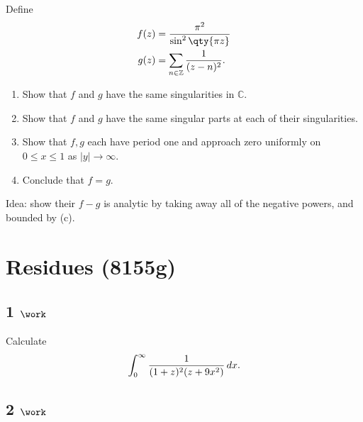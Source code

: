Define
\begin{align*}
f(z) &= {\pi^2 \over \sin^2 \qty{\pi z} } \\
g(z) &= \sum_{n\in {\mathbb{Z}}} {1\over (z-n)^2}
.\end{align*}

\begin{enumerate}
\def\labelenumi{\alph{enumi}.}
\tightlist
\item
  Show that \(f\) and \(g\) have the same singularities in
  \({\mathbb{C}}\).
\item
  Show that \(f\) and \(g\) have the same singular parts at each of
  their singularities.
\item
  Show that \(f, g\) each have period one and approach zero uniformly on
  \(0\leq x \leq 1\) as \({\left\lvert {y} \right\rvert}\to \infty\).
\item
  Conclude that \(f = g\).
\end{enumerate}


\begin{solution}

\hfill

\begin{concept}

\hfill

Idea: show their \(f-g\) is analytic by taking away all of the negative
powers, and bounded by (c).

\end{concept}

\end{solution}

\hypertarget{residues-8155g}{%
\section{Residues (8155g)}\label{residues-8155g}}

\hypertarget{work-48}{%
\subsection{\texorpdfstring{1
\(\work\)}{1 \textbackslash work}}\label{work-48}}

Calculate
\begin{align*}
\int_0^\infty {1 \over (1+z)^2 (z+9x^2)} \, dx
.\end{align*}

\hypertarget{work-49}{%
\subsection{\texorpdfstring{2
\(\work\)}{2 \textbackslash work}}\label{work-49}}

